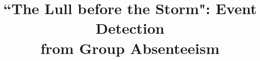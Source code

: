 \documentclass[conference]{IEEEtran}
\begin{document}
%
\title{``The Lull before the Storm": Event Detection\\ from Group Absenteeism}





\maketitle
\end{document}
